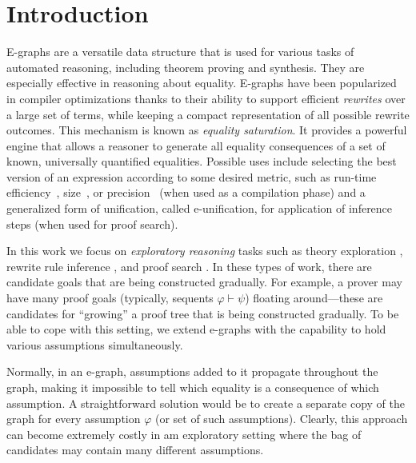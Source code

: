 \section{Introduction}
\label{intro}

E-graphs are a versatile data structure that is used for various tasks of automated reasoning, including theorem proving and synthesis.
They are especially effective in reasoning about equality.
E-graphs have been popularized in compiler optimizations thanks to their ability to support efficient \emph{rewrites} over a large set of terms, while keeping a compact representation of all possible rewrite outcomes.
This mechanism is known as \emph{equality saturation}.
It provides a powerful engine that allows a reasoner to generate all equality consequences of a set of known, universally quantified equalities.
Possible uses include selecting the best version of an expression according to some desired metric, such as run-time efficiency~\cite{comp-optimizations}, size~\cite{DBLP:conf/fmcad/FlattCWTP22,DBLP:conf/fmcad/NotzliBNPRBT22}, or precision~\cite{herbie}
(when used as a compilation phase)
and a generalized form of unification, called e-unification, for application of inference steps (when used for proof search).

In this work we focus on \emph{exploratory reasoning} tasks such as theory exploration \cite{thesy}, rewrite rule inference \cite{ruler}, and proof search \cite{vampire,cyclist,cycleq,others}.
In these types of work, there are candidate goals that are being constructed gradually.
For example, a prover may have many proof goals (typically, sequents $\varphi\vdash\psi$) floating around---these are candidates for ``growing'' a proof tree that is being constructed gradually.
To be able to cope with this setting, we extend e-graphs with the capability to hold various assumptions simultaneously.

Normally, in an e-graph, assumptions added to it propagate throughout the graph, making it impossible to tell which equality is a consequence of which assumption.
A straightforward solution would be to create a separate copy of the graph for every assumption $\varphi$ (or set of such assumptions).
Clearly, this approach can become extremely costly in am exploratory setting where the bag of candidates may contain many different assumptions.

